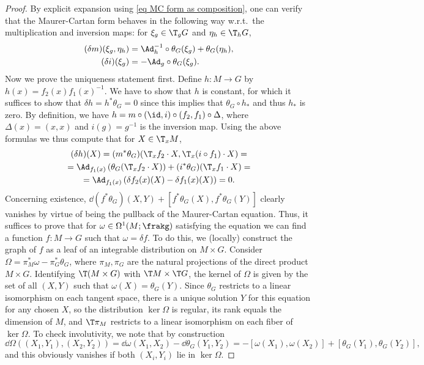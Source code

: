 \begin{proof}
    By explicit expansion using \eqref{eq MC form as composition}, one can verify that the Maurer-Cartan form behaves in the following way w.r.t.\ the multiplication and inversion maps: for $\xi_g\in \T_g G$ and $\eta_h\in \T_hG$,
    \begin{align}
       (\delta m)(\xi_g,\eta_h)&=\Ad_{h}^{-1}\circ \theta_G(\xi_g)+\theta_G(\eta_h),   \label{eq MC form under m}  \\
       (\delta i)(\xi_g)&=-\Ad_g\circ\theta_G(\xi_g). \label{eq MC form under i}
    \end{align}
    Now we prove the uniqueness statement first. Define $h:M\to G$ by $h(x)=f_2(x)f_1(x)^{-1}$. We have to show that $h$ is constant, for which it suffices to show that $\delta h=h^\ast\theta_G=0$ since this implies that $\theta_G\circ h_\ast$ and thus $h_\ast$ is zero. By definition, we have $h=m\circ (\id,i)\circ(f_2,f_1)\circ \Delta$, where $\Delta(x)=(x,x)$ and $i(g)=g^{-1}$ is the inversion map. Using the above formulas we thus compute that for $X\in \T_xM$,
    \begin{multline}
        (\delta h)(X)=(m^\ast \theta_G)(\T_x f_2\cdot X,\T_x(i\circ f_1)\cdot X)=\\
        =\Ad_{f_1(x)}\left(\theta_G(\T_xf_2\cdot X)\right)+(i^\ast\theta_G)(\T_xf_1\cdot X)=\\
        =\Ad_{f_1(x)}\left(\delta f_2(x)(X)-\delta f_1(x)(X)\right)=0.
    \end{multline}
    Concerning existence, $\dd(f^\ast\theta_G)(X,Y)+[f^\ast\theta_G(X),f^\ast\theta_G(Y)]$ clearly vanishes by virtue of being the pullback of the Maurer-Cartan equation. Thus, it suffices to prove that for $\omega\in\Omega^1(M;\frakg)$ satisfying the equation we can find a function $f:M\to G$ such that $\omega=\delta f$. To do this, we (locally) construct the graph of $f$ as a leaf of an integrable distribution on $M\times G$. Consider $\Omega=\pi^\ast_M\omega-\pi^\ast_G \theta_G$, where $\pi_M,\pi_G$ are the natural projections of the direct product $M\times G$. Identifying $\T(M\times G)$ with $\T M\times \T G$, the kernel of $\Omega$ is given by the set of all $(X,Y)$ such that $\omega(X)=\theta_G(Y)$. Since $\theta_G$ restricts to a linear isomorphism on each tangent space, there is a unique solution $Y$ for this equation for any chosen $X$, so the distribution $\ker\Omega$ is regular, its rank equals the dimension of $M$, and $\T\pi_M$ restricts to a linear isomorphism on each fiber of $\ker \Omega$. To check involutivity, we note that by construction
    \[\dd\Omega\left((X_1,Y_1),(X_2,Y_2)\right)=\dd\omega(X_1,X_2)-\dd \theta_G(Y_1,Y_2)=-[\omega(X_1),\omega(X_2)]+[\theta_G(Y_1),\theta_G(Y_2)],\]
    and this obviously vanishes if both $(X_i,Y_i)$ lie in $\ker\Omega$.


\end{proof}
